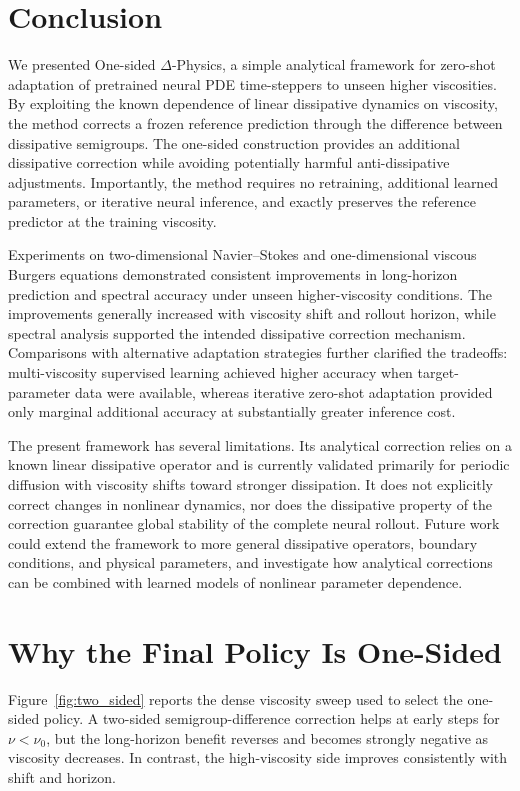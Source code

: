 \documentclass[10pt,twocolumn]{article}
\newcommand{\nuRef}{\nu_0}
\begin{document}
\section{Conclusion}
\label{sec:conclusion}

We presented One-sided $\Delta$-Physics, a simple
analytical framework for zero-shot adaptation of
pretrained neural PDE time-steppers to unseen
higher viscosities. By exploiting the known
dependence of linear dissipative dynamics on
viscosity, the method corrects a frozen reference
prediction through the difference between
dissipative semigroups. The one-sided construction
provides an additional dissipative correction
while avoiding potentially harmful anti-dissipative
adjustments. Importantly, the method requires
no retraining, additional learned parameters,
or iterative neural inference, and exactly
preserves the reference predictor at the
training viscosity.

Experiments on two-dimensional Navier--Stokes
and one-dimensional viscous Burgers equations
demonstrated consistent improvements in
long-horizon prediction and spectral accuracy
under unseen higher-viscosity conditions.
The improvements generally increased with
viscosity shift and rollout horizon, while
spectral analysis supported the intended
dissipative correction mechanism.
Comparisons with alternative adaptation
strategies further clarified the tradeoffs:
multi-viscosity supervised learning achieved
higher accuracy when target-parameter data
were available, whereas iterative zero-shot
adaptation provided only marginal additional
accuracy at substantially greater inference cost.

The present framework has several limitations.
Its analytical correction relies on a known
linear dissipative operator and is currently
validated primarily for periodic diffusion
with viscosity shifts toward stronger
dissipation. It does not explicitly correct
changes in nonlinear dynamics, nor does
the dissipative property of the correction
guarantee global stability of the complete
neural rollout. Future work could extend
the framework to more general dissipative
operators, boundary conditions, and physical
parameters, and investigate how analytical
corrections can be combined with learned
models of nonlinear parameter dependence.






\clearpage
\onecolumn
\appendix
\section{Why the Final Policy Is One-Sided}
\label{sec:one_sided_ablation}
Figure~\ref{fig:two_sided} reports the dense viscosity sweep used to select the
one-sided policy. A two-sided semigroup-difference correction helps at early
steps for $\nu<\nuRef$, but the long-horizon benefit reverses and becomes
strongly negative as viscosity decreases. In contrast, the high-viscosity side
improves consistently with shift and horizon.
\end{document}
